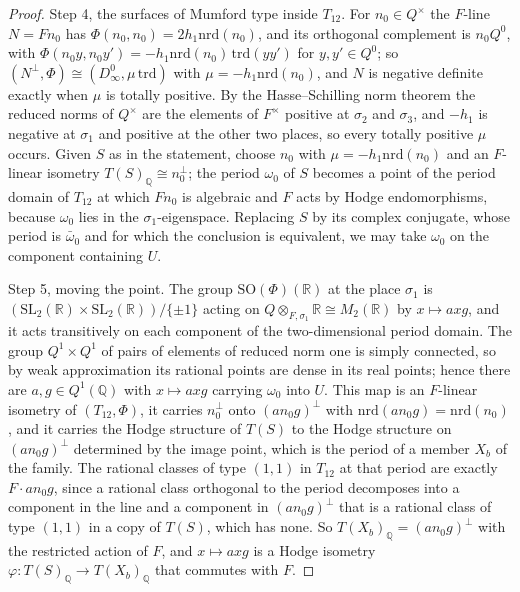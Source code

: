 \documentclass[11pt,reqno]{amsart}
\numberwithin{equation}{section}
\theoremstyle{plain}
\theoremstyle{definition}
\newcommand{\QQ}{\mathbb{Q}}
\newcommand{\RR}{\mathbb{R}}
\newcommand{\SL}{\mathrm{SL}}
\begin{document}
\begin{proof}
Step 4, the surfaces of Mumford type inside $T_{12}$. For $n_{0}\in Q^{\times}$ the $F$-line $N=Fn_{0}$ has $\Phi(n_{0},n_{0})=2h_{1}\mathrm{nrd}(n_{0})$, and its orthogonal complement is $n_{0}Q^{0}$, with $\Phi(n_{0}y,n_{0}y')=-h_{1}\mathrm{nrd}(n_{0})\,\mathrm{trd}(yy')$ for $y,y'\in Q^{0}$; so $(N^{\perp},\Phi)\cong(D_{\infty}^{0},\mu\,\mathrm{trd})$ with $\mu=-h_{1}\mathrm{nrd}(n_{0})$, and $N$ is negative definite exactly when $\mu$ is totally positive. By the Hasse--Schilling norm theorem \cite[Thm.~33.15]{Rei03} the reduced norms of $Q^{\times}$ are the elements of $F^{\times}$ positive at $\sigma_{2}$ and $\sigma_{3}$, and $-h_{1}$ is negative at $\sigma_{1}$ and positive at the other two places, so every totally positive $\mu$ occurs. Given $S$ as in the statement, choose $n_{0}$ with $\mu=-h_{1}\mathrm{nrd}(n_{0})$ and an $F$-linear isometry $T(S)_{\QQ}\cong n_{0}^{\perp}$; the period $\omega_{0}$ of $S$ becomes a point of the period domain of $T_{12}$ at which $Fn_{0}$ is algebraic and $F$ acts by Hodge endomorphisms, because $\omega_{0}$ lies in the $\sigma_{1}$-eigenspace. Replacing $S$ by its complex conjugate, whose period is $\bar\omega_{0}$ and for which the conclusion is equivalent, we may take $\omega_{0}$ on the component containing $U$.

Step 5, moving the point. The group $\mathrm{SO}(\Phi)(\RR)$ at the place $\sigma_{1}$ is $(\SL_{2}(\RR)\times\SL_{2}(\RR))/\{\pm1\}$ acting on $Q\otimes_{F,\sigma_{1}}\RR\cong M_{2}(\RR)$ by $x\mapsto axg$, and it acts transitively on each component of the two-dimensional period domain. The group $Q^{1}\times Q^{1}$ of pairs of elements of reduced norm one is simply connected, so by weak approximation \cite[Thm.~7.8]{PR94} its rational points are dense in its real points; hence there are $a,g\in Q^{1}(\QQ)$ with $x\mapsto axg$ carrying $\omega_{0}$ into $U$. This map is an $F$-linear isometry of $(T_{12},\Phi)$, it carries $n_{0}^{\perp}$ onto $(an_{0}g)^{\perp}$ with $\mathrm{nrd}(an_{0}g)=\mathrm{nrd}(n_{0})$, and it carries the Hodge structure of $T(S)$ to the Hodge structure on $(an_{0}g)^{\perp}$ determined by the image point, which is the period of a member $X_{b}$ of the family. The rational classes of type $(1,1)$ in $T_{12}$ at that period are exactly $F\cdot an_{0}g$, since a rational class orthogonal to the period decomposes into a component in the line and a component in $(an_{0}g)^{\perp}$ that is a rational class of type $(1,1)$ in a copy of $T(S)$, which has none. So $T(X_{b})_{\QQ}=(an_{0}g)^{\perp}$ with the restricted action of $F$, and $x\mapsto axg$ is a Hodge isometry $\varphi\colon T(S)_{\QQ}\to T(X_{b})_{\QQ}$ that commutes with $F$.


\end{proof}
\end{document}
